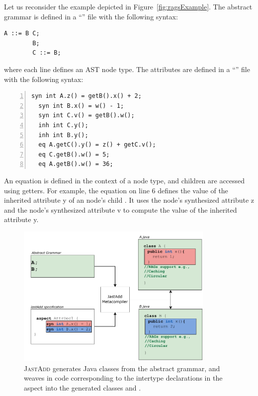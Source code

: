 Let us reconsider the example depicted in Figure~\ref{fig:ragsExample}.
The abstract grammar is defined in a ``'' file with the following syntax:
    \begin{lstlisting}[language=JastAdd]
        A ::= B C;
        B;
        C ::= B;
    \end{lstlisting}
where each line defines an AST node type.
The attributes are defined in a ``'' file with the following syntax:
    \begin{lstlisting}[language=JastAdd, numbers=left,]
  syn int A.z() = getB().x() + 2;
  syn int B.x() = w() - 1;
  syn int C.v() = getB().w();
  inh int C.y();
  inh int B.y();
  eq A.getC().y() = z() + getC.v();
  eq C.getB().w() = 5;
  eq A.getB().w() = 36;
    \end{lstlisting}
An equation is defined in the context of a node type, and children are accessed using getters.
For example, the equation on line 6 defines the value of the
inherited attribute \textcolor{ATGsym}{y} of an  node's child .
It uses the  node's synthesized attribute \textcolor{ATGsym}{z} and the  node's
synthesized attribute \textcolor{ATGsym}{v} to compute the value of the inherited attribute \textcolor{ATGsym}{y}.
\begin{figure}
    \begin{center}
        \includegraphics[width=0.85\textwidth]{kappa/img/Intertype.pdf}
    \end{center}
    \caption{\label{fig:interType} \textsc{JastAdd} generates Java classes from the abstract grammar, and
    weaves in code corresponding to the intertype declarations in the aspect into the generated classes  and .}
\end{figure}


